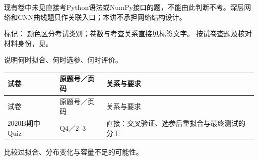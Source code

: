 现有卷中未见直接考Python语法或NumPy接口的题，不能由此判断不考。深层网络和CNN曲线题只作关联入口；本讲不承担网络结构设计。


标记：   颜色区分考试类别；卷数与考查关系直接见标签文字。
按试卷查题及核对材料身份，见。



说明何时拟合、何时选参、何时评价。

\begingroup\small\setlength{\tabcolsep}{3pt}\renewcommand{\arraystretch}{1.22}
\begin{longtable}{@{}>{\raggedright\arraybackslash}p{}>{\raggedright\arraybackslash}p{}>{\raggedright\arraybackslash}p{}@{}}
\toprule
试卷 & 原题号／页码 & 关系与要求 \\
\midrule\endfirsthead
试卷 & 原题号／页码 & 关系与要求 \\
\midrule\endhead
\bottomrule\endfoot
2020B期中Quiz & Q4／2–3 & 直接：交叉验证、选参后重拟合与最终测试的分工 \\
\end{longtable}\endgroup



比较过拟合、分布变化与容量不足的可能性。

